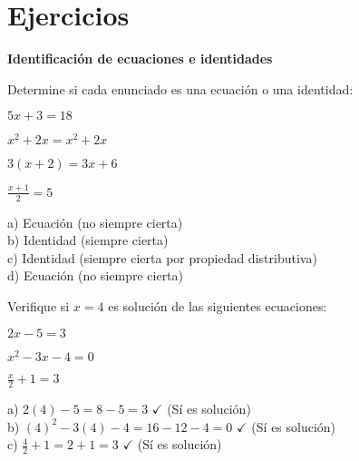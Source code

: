 
\section{Ejercicios}

\begin{exercise}
\textbf{Identificación de ecuaciones e identidades}

\problem Determine si cada enunciado es una ecuación o una identidad:
\begin{exerciselist}
    \item $5x + 3 = 18$
    \item $x^2 + 2x = x^2 + 2x$
    \item $3(x + 2) = 3x + 6$
    \item $\frac{x+1}{2} = 5$
\end{exerciselist}

\begin{solucion}
a) Ecuación (no siempre cierta)\\
b) Identidad (siempre cierta)\\
c) Identidad (siempre cierta por propiedad distributiva)\\
d) Ecuación (no siempre cierta)
\end{solucion}

\problem Verifique si $x = 4$ es solución de las siguientes ecuaciones:
\begin{exerciselist}
    \item $2x - 5 = 3$
    \item $x^2 - 3x - 4 = 0$
    \item $\frac{x}{2} + 1 = 3$
\end{exerciselist}

\begin{solucion}
a) $2(4) - 5 = 8 - 5 = 3$ $\checkmark$ (Sí es solución)\\
b) $(4)^2 - 3(4) - 4 = 16 - 12 - 4 = 0$ $\checkmark$ (Sí es solución)\\
c) $\frac{4}{2} + 1 = 2 + 1 = 3$ $\checkmark$ (Sí es solución)
\end{solucion}
\end{exercise}

